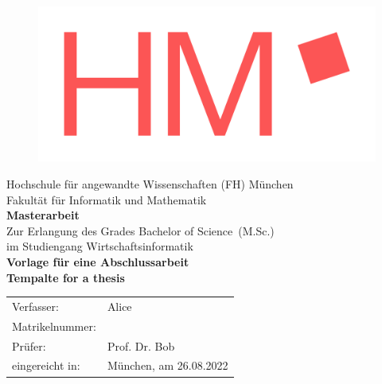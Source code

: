 \begin{titlepage}
\singlespacing

\begin{figure}[H]
	\centering
	\includegraphics[width=0.3\linewidth]{src/HM_Logo_RGB}
\end{figure}


\begin{center}
	\small{Hochschule für angewandte Wissenschaften (FH) München \\
		Fakultät für Informatik und Mathematik}\\[10ex]
	
	\LARGE{\textbf{Masterarbeit}}\\[2ex]
	
	\small{Zur Erlangung des Grades Bachelor of Science~(M.Sc.) \\
	im Studiengang Wirtschaftsinformatik}\\[5ex]
	
	\Large{\textbf{Vorlage für eine Abschlussarbeit}}\\[10ex]
	
	\textbf{Tempalte for a thesis}
\end{center}

\vfill

\begin{flushleft}
	\normalsize{}
	\begin{tabular}{ll}
		Verfasser: & \quad Alice\\[1ex]
		Matrikelnummer: & \quad 123456789\\[1ex]
		Prüfer: & \quad Prof. Dr. Bob\\[1ex]
		eingereicht in: & \quad München, am 26.08.2022
	\end{tabular}
\end{flushleft}
	
\end{titlepage}
